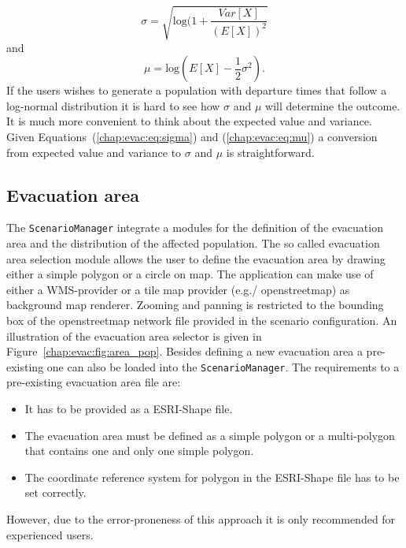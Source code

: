 \begin{equation}
\sigma = \sqrt{\text{log}(1+\frac{Var[X]}{(E[X])^2}}\label{chap:evac:eq:sigma}
\end{equation}
and 
\begin{equation}
\mu = \text{log}(E[X] - \frac{1}{2}\sigma^2).\label{chap:evac:eq:mu}
\end{equation}
If the users wishes to generate a population with departure times that follow a log-normal distribution it is hard to see how $\sigma$ and $\mu$ will determine the outcome. It is much more convenient to think about the expected value and variance. Given Equations~(\ref{chap:evac:eq:sigma}) and (\ref{chap:evac:eq:mu}) a conversion from expected value and variance to $\sigma$ and $\mu$ is straightforward.

\subsection{Evacuation area}%
The \verb+ScenarioManager+ integrate a modules for the definition of the evacuation area and the distribution of the affected population. The so called evacuation area selection module allows the user to define the evacuation area by drawing either a simple polygon or a circle on map. The application can make use of either a WMS-provider or a tile map provider (e.g./ openstreetmap) as background map renderer. Zooming and panning is restricted to the bounding box of the openstreetmap network file provided in the scenario configuration. An illustration of the evacuation area selector is given in Figure~\ref{chap:evac:fig:area_pop}. Besides defining a new evacuation area a pre-existing one can also be loaded into the \verb+ScenarioManager+. The requirements to a pre-existing evacuation area file are:
\begin{itemize}
\item It has to be provided as a ESRI-Shape file.
\item The evacuation area must be defined as a simple polygon or a multi-polygon that contains one and only one simple polygon.
\item The coordinate reference system for polygon in the ESRI-Shape file has to be set correctly. 
\end{itemize}
However, due to the error-proneness of this approach it is only recommended for experienced users.


